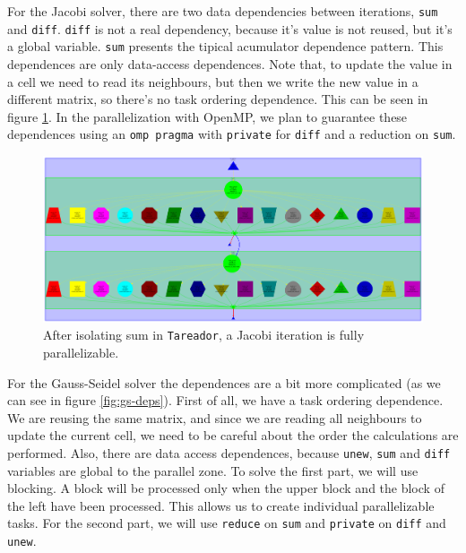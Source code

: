 \documentclass[a4paper,11pt]{article}
\begin{document}
For the Jacobi solver, there are two data dependencies between
iterations, \texttt{sum} and \texttt{diff}. \texttt{diff} is not a
real dependency, because it's value is not reused, but it's a global
variable. \texttt{sum} presents the tipical acumulator dependence
pattern. This dependences are only data-access dependences. Note that,
to update the value in a cell we need to read its neighbours, but then
we write the new value in a different matrix, so there's no task
ordering dependence. This can be seen in figure \ref{fig:j-deps}. In
the parallelization with OpenMP, we plan to guarantee these
dependences using an \texttt{omp pragma} with \texttt{private} for
\texttt{diff} and a reduction on \texttt{sum}.
\begin{figure}[h!]
  \includegraphics[width=1.0\textwidth]{figs/dependencies_j.pdf}
  \caption{After isolating sum in \texttt{Tareador}, a Jacobi
    iteration is fully parallelizable.}
  \label{fig:j-deps}
\end{figure}

For the Gauss-Seidel solver the dependences are a bit more complicated
(as we can see in figure \ref{fig:gs-deps}). First of all, we have a
task ordering dependence. We are reusing the same matrix, and since we
are reading all neighbours to update the current cell, we need to be
careful about the order the calculations are performed. Also, there
are data access dependences, because \texttt{unew}, \texttt{sum} and
\texttt{diff} variables are global to the parallel zone. To solve the
first part, we will use blocking. A block will be processed only when
the upper block and the block of the left have been processed. This
allows us to create individual parallelizable tasks. For the second
part, we will use \texttt{reduce} on \texttt{sum} and \texttt{private}
on \texttt{diff} and \texttt{unew}.
\end{document}

